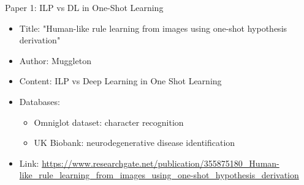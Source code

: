 \begin{frame}{Paper 1: ILP vs DL in One-Shot Learning}

\begin{itemize}
\vfill
    \item Title: "Human-like rule learning from images using one-shot hypothesis derivation"
\vfill
    \item Author: Muggleton
\vfill
    \item Content: ILP vs Deep Learning in One Shot Learning
\vfill
    \item Databases: 
    \begin{itemize}
        \item Omniglot dataset: character recognition
        \item UK Biobank: neurodegenerative disease identiﬁcation
    \end{itemize} 
\vfill
    \item Link: \url{https://www.researchgate.net/publication/355875180_Human-like_rule_learning_from_images_using_one-shot_hypothesis_derivation}
\vfill
\end{itemize}
    
\end{frame}

